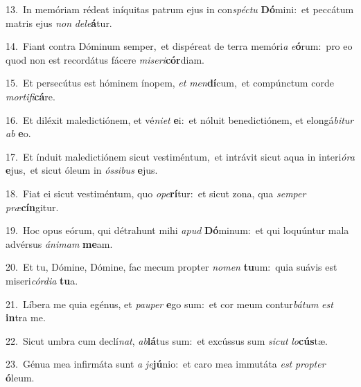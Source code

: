 {\numbfont\textcolor{\numbcolor}{13.}}~In memóriam rédeat iníquitas patrum ejus in con\-\textit{spéc}\-\textit{tu} \textbf{Dó}\-mini:~\star et peccátum matris ejus \textit{non} \textit{de}\-\textit{le}\textbf{á}tur.\par
{\numbfont\textcolor{\numbcolor}{14.}}~Fiant contra Dóminum semper,~\dagger et dispéreat de terra memóri\textit{a} \textit{e}\-\textbf{ó}rum:~\star pro eo quod non est recordátus fácere \textit{mi}\-\textit{se}\textit{ri}\textbf{cór}diam.\par
{\numbfont\textcolor{\numbcolor}{15.}}~Et persecútus est hóminem ínopem, \textit{et} \textit{men}\-\textbf{dí}cum,~\star et compúnctum corde \textit{mor}\-\textit{ti}\textit{fi}\textbf{cá}re.\par
{\numbfont\textcolor{\numbcolor}{16.}}~Et diléxit maledictiónem, et vé\-\textit{ni}\-\textit{et} \textbf{e}\-i:~\star et nóluit benedictiónem, et elongá\-\textit{bi}\-\textit{tur} \textit{ab} \textbf{e}\-o.\par
{\numbfont\textcolor{\numbcolor}{17.}}~Et índuit maledictiónem sicut vestiméntum,~\dagger et intrávit sicut aqua in interi\-\textit{ó}\-\textit{ra} \textbf{e}\-jus,~\star et sicut óleum in \textit{ós}\-\textit{si}\textit{bus} \textbf{e}\-jus.\par
{\numbfont\textcolor{\numbcolor}{18.}}~Fiat ei sicut vestiméntum, quo \textit{o}\-\textit{pe}\textbf{rí}tur:~\star et sicut zona, qua \textit{sem}\-\textit{per} \textit{præ}\-\textbf{cín}gitur.\par
{\numbfont\textcolor{\numbcolor}{19.}}~Hoc opus eórum, qui détrahunt mihi \textit{a}\-\textit{pud} \textbf{Dó}\-minum:~\star et qui loquúntur mala advérsus \textit{á}\-\textit{ni}\textit{mam} \textbf{me}\-am.\par
{\numbfont\textcolor{\numbcolor}{20.}}~Et tu, Dómine, Dómine, fac mecum propter \textit{no}\-\textit{men} \textbf{tu}\-um:~\star quia suávis est miseri\-\textit{cór}\-\textit{di}\textit{a} \textbf{tu}\-a.\par
{\numbfont\textcolor{\numbcolor}{21.}}~Líbera me quia egénus, et \textit{pau}\-\textit{per} \textbf{e}\-go sum:~\star et cor meum contur\-\textit{bá}\-\textit{tum} \textit{est} \textbf{in}\-tra me.\par
{\numbfont\textcolor{\numbcolor}{22.}}~Sicut umbra cum declí\-\textit{nat}\-, \textit{ab}\-\textbf{lá}tus sum:~\star et excússus sum \textit{sic}\-\textit{ut} \textit{lo}\-\textbf{cús}tæ.\par
{\numbfont\textcolor{\numbcolor}{23.}}~Génua mea infirmáta sunt \textit{a} \textit{je}\-\textbf{jú}nio:~\star et caro mea immutáta \textit{est} \textit{prop}\-\textit{ter} \textbf{ó}\-leum.\par

